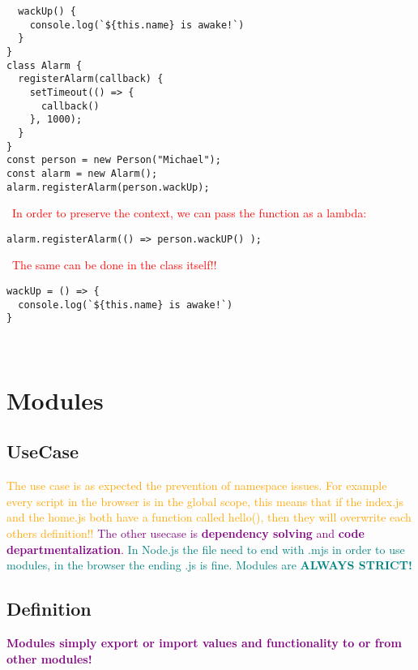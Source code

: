 \documentclass[main.tex,fontsize=6pt,paper=a4,paper=landscape,DIV=calc,]{scrartcl}
\begin{document}
\begin{multicols*}{4}
\begin{lstlisting}
  wackUp() {
    console.log(`${this.name} is awake!`)
  }
}
class Alarm {
  registerAlarm(callback) {
    setTimeout(() => {
      callback()
    }, 1000);
  }
}
const person = new Person("Michael");
const alarm = new Alarm();
alarm.registerAlarm(person.wackUp);
\end{lstlisting}
\, \newline
\textcolor{red}{In order to preserve the context, we can pass the function as a lambda:}\newline
\begin{lstlisting}
alarm.registerAlarm(() => person.wackUP() );
\end{lstlisting}
\, \newline 
\textcolor{red}{The same can be done in the class itself!!}\newline
\begin{lstlisting}
wackUp = () => {
  console.log(`${this.name} is awake!`)
}
\end{lstlisting}
\, \newline

\section{Modules}

\subsection{UseCase}  
\textcolor{orange}{The use case is as expected the prevention of namespace issues.\newline
For example every script in the browser is in the global scope, this means that if the index.js and the home.js both have a function called hello(), then they will overwrite each others definition!!}\newline
\textcolor{purple}{The other usecase is \textbf{dependency solving} and \textbf{code departmentalization}.}\newline
\textcolor{teal}{In Node.js the file need to end with .mjs in order to use modules, in the browser the ending .js is fine.}\newline
\textcolor{teal}{Modules are \textbf{ALWAYS STRICT!}}

\subsection{Definition}  
\textcolor{purple}{\textbf{Modules simply export or import values and functionality to or from other modules!}}


\end{multicols*}
\end{document}
